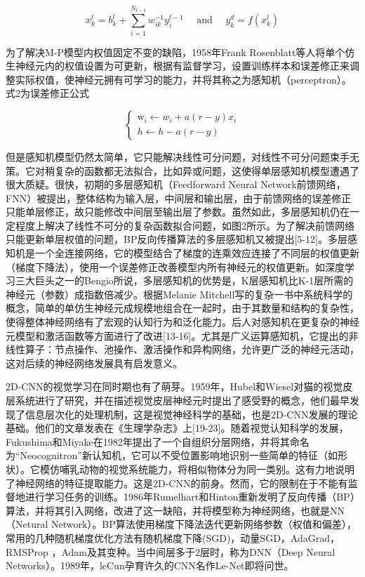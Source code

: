 \documentclass[15pt]{article}
\begin{document}
\begin{equation}
	x_{k}^{l}=b_{k}^{l}+\sum_{i=1}^{N_{l-1}} w_{i k}^{-1} y_{i}^{l-1} \quad \text { and } \quad y_{k}^{d}=f\left(x_{k}^{l}\right)
\end{equation}

为了解决M-P模型内权值固定不变的缺陷，1958年Frank Rosenblatt等人将单个仿生神经元内的权值设置为可更新，根据有监督学习，设置训练样本和误差修正来调整实际权值，使神经元拥有可学习的能力，并将其称之为感知机（perceptron）\cite{ref3}。式2为误差修正公式

\begin{equation}
	\left\{\begin{array}{l}\mathrm{w}_{i} \leftarrow w_{i}+a(r-y) x_{i} \\ h \leftarrow h-a(r-y)\end{array}\right.
\end{equation}

但是感知机模型仍然太简单，它只能解决线性可分问题，对线性不可分问题束手无策。它对稍复杂的函数都无法拟合，比如异或问题，这使得单层感知机模型遭遇了很大质疑。很快，初期的多层感知机（Feedforward Neural Network前馈网络，FNN）被提出，整体结构为输入层，中间层和输出层，由于前馈网络的误差修正只能单层修正，故只能修改中间层至输出层了参数。虽然如此，多层感知机仍在一定程度上解决了线性不可分的复杂函数拟合问题，如图2所示。为了解决前馈网络只能更新单层权值的问题\cite{ref4}，BP反向传播算法的多层感知机又被提出[5-12]。多层感知机是一个全连接网络，它的模型结合了梯度的连乘效应连接了不同层的权值更新（梯度下降法），使用一个误差修正改善模型内所有神经元的权值更新。如深度学习三大巨头之一的Bengio所说，多层感知机的优势是，K层感知机比K-1层所需的神经元（参数）成指数倍减少。根据Melanie Mitchell写的复杂一书中系统科学的概念，简单的单仿生神经元成规模地组合在一起时，由于其数量和结构的复杂性，使得整体神经网络有了宏观的认知行为和泛化能力。后人对感知机在更复杂的神经元模型和激活函数等方面进行了改进[13-16]。尤其是广义运算感知机\cite{ref17}\cite{ref18}，它提出的非线性算子：节点操作、池操作、激活操作和异构网络，允许更广泛的神经元活动，这对后续的神经网络发展具有启发意义。

2D-CNN的视觉学习在同时期也有了萌芽。1959年，Hubel和Wiesel对猫的视觉皮层系统进行了研究\cite{ref19}，并在描述视觉皮层神经元时提出了感受野的概念，他们最早发现了信息层次化的处理机制，这是视觉神经科学的基础，也是2D-CNN发展的理论基础。他们的文章发表在《生理学杂志》上[19-23]。随着视觉认知科学的发展，Fukushima和Miyake在1982年提出了一个自组织分层网络，并将其命名为“Neocognitron”新认知机\cite{ref24}，它可以不受位置影响地识别一些简单的特征（如形状）。它模仿哺乳动物的视觉系统能力，将相似物体分为同一类别。这有力地说明了神经网络的特征提取能力。这是2D-CNN的前身。然而，它的限制在于不能有监督地进行学习任务的训练。1986年Rumelhart和Hinton重新发明了反向传播（BP）算法，并将其引入网络\cite{ref6}，改进了这一缺陷，并将模型称为神经网络，也就是NN（Netural Network）。BP算法使用梯度下降法迭代更新网络参数（权值和偏差），常用的几种随机梯度优化方法有随机梯度下降(SGD)，动量SGD\cite{ref97}，AdaGrad\cite{ref98}，RMSProp \cite{ref99}，Adam\cite{ref100}及其变种\cite{ref101}。当中间层多于2层时，称为DNN（Deep Neural Networks）。1989年，leCun孕育许久的CNN名作Le-Net即将问世\cite{ref25}。
\end{document}
